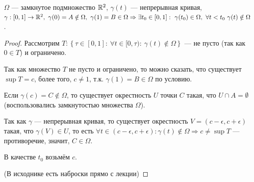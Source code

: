 \begin{lemma}
    $\Omega$ — замкнутое подмножество $\mathbb{R}^2$, $\gamma(t)$ — непрерывная кривая, $\gamma: [0,1] \to \R^2, \ \gamma(0) = A \notin \Omega, \ \gamma(1) = B \in \Omega \Rightarrow \exists t_0 \in  [0,1]: \ \gamma(t_0) \in \Omega, \ \forall t < t_0 \ \gamma(t) \notin \Omega$.
\end{lemma}
\begin{proof}
    Рассмотрим $T: \left\{
        \tau \in [0,1]: \ \forall t \in [0, \tau): \ \gamma(t) \notin \Omega
    \right\}$ — не пусто (так как $0 \in T$) и ограничено.

    Так как множество $T$ не пусто и ограничено, то можно сказать, что существует $\sup{T} = c$, более того, $c \neq 1$, т.к. $\gamma(1) = B \in \Omega$ по условию.

    Если $\gamma(c) = C \notin \Omega$, то существует окрестность $U$ точки $C$ такая, что $U \cap A = \emptyset$ (воспользовались замкнутостью множества $\Omega$).

    Так как $\gamma$ — непрерывная кривая, то существует окрестность $V = (c - \epsilon, c + \epsilon)$ такая, что $\gamma(V) \in U$, то есть $\forall t \in (c - \epsilon, c + \epsilon): \gamma(t) \notin \Omega \Rightarrow c \neq \sup{T}$ — противоречие, значит, $C \in \Omega$.
    
    В качестве $t_0$ возьмём $c$.

    (В исходнике есть наброски прямо с лекции)
\end{proof}

